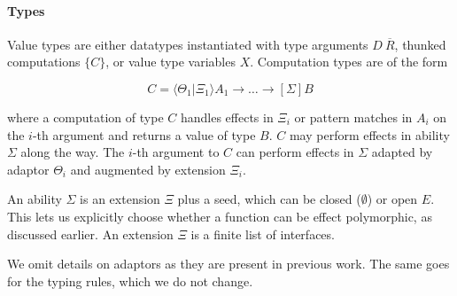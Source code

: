 \documentclass[msc,deptreport,cs]{infthesis} %
\newcommand{\adapt}{\Theta}
\newcommand{\ext}{\Xi}
\newcommand{\sigs}{\Sigma}
\newcommand{\thunk}[1]{\{{#1}\}}
\newcommand{\ev}{E}
\newcommand{\effin}[1]{\langle {#1} \rangle}
\newcommand{\effout}[1]{[{#1}]}
\newcommand{\nowt}{\emptyset}
\newcommand{\pipe}{\texttt{|}}
\begin{document}
\paragraph*{Types}
Value types are either datatypes instantiated with type arguments
$D~\overline{R}$, thunked computations $\thunk{C}$, or value type variables $X$.
%
Computation types are of the form

\[
  C = \effin{\adapt_1\pipe\ext_1}A_1 \to \dots \to \effout{\sigs} B
\]

\noindent where a computation of type $C$ handles effects in $\ext_i$ or pattern
matches in $A_i$ on the $i$-th argument and returns a value of type $B$. $C$ may
perform effects in ability $\sigs$ along the way.
%
The $i$-th argument to $C$ can perform effects in $\sigs$ adapted by adaptor
$\adapt_i$ and augmented by extension $\ext_i$.

An ability $\sigs$ is an extension $\ext$ plus a seed, which can be closed
($\nowt$) or open $\ev$. This lets us explicitly choose whether a function can
be effect polymorphic, as discussed earlier. An extension $\ext$ is a finite
list of interfaces.


We omit details on adaptors as they are present in previous work. The same goes
for the typing rules, which we do not change.
\end{document}
